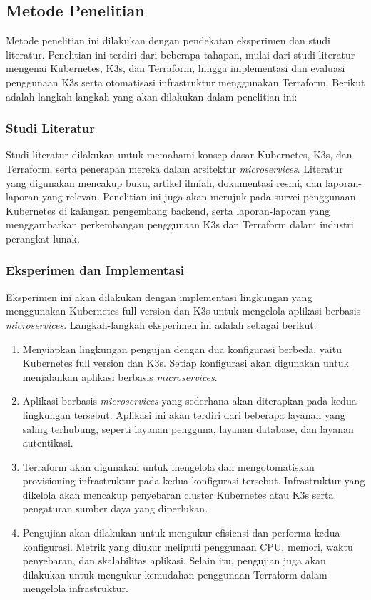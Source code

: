 \subsection{Metode Penelitian}

Metode penelitian ini dilakukan dengan pendekatan eksperimen dan studi literatur. Penelitian ini terdiri dari beberapa tahapan, mulai dari studi literatur mengenai Kubernetes, K3s, dan Terraform, hingga implementasi dan evaluasi penggunaan K3s serta otomatisasi infrastruktur menggunakan Terraform. Berikut adalah langkah-langkah yang akan dilakukan dalam penelitian ini:

\subsubsection{Studi Literatur}
Studi literatur dilakukan untuk memahami konsep dasar Kubernetes, K3s, dan Terraform, serta penerapan mereka dalam arsitektur \textit{microservices}. Literatur yang digunakan mencakup buku, artikel ilmiah, dokumentasi resmi, dan laporan-laporan yang relevan. Penelitian ini juga akan merujuk pada survei penggunaan Kubernetes di kalangan pengembang backend, serta laporan-laporan yang menggambarkan perkembangan penggunaan K3s dan Terraform dalam industri perangkat lunak.

\subsubsection{Eksperimen dan Implementasi}
Eksperimen ini akan dilakukan dengan implementasi lingkungan yang menggunakan Kubernetes full version dan K3s untuk mengelola aplikasi berbasis \textit{microservices}. Langkah-langkah eksperimen ini adalah sebagai berikut:
\begin{enumerate}
    \renewcommand{\labelenumi}{\arabic{enumi})}  
    \item Menyiapkan lingkungan pengujan dengan dua konfigurasi berbeda, yaitu Kubernetes full version dan K3s. Setiap konfigurasi akan digunakan untuk menjalankan aplikasi berbasis \textit{microservices}.
    
    \item Aplikasi berbasis \textit{microservices} yang sederhana akan diterapkan pada kedua lingkungan tersebut. Aplikasi ini akan terdiri dari beberapa layanan yang saling terhubung, seperti layanan pengguna, layanan database, dan layanan autentikasi.
    
    \item Terraform akan digunakan untuk mengelola dan mengotomatiskan provisioning infrastruktur pada kedua konfigurasi tersebut. Infrastruktur yang dikelola akan mencakup penyebaran cluster Kubernetes atau K3s serta pengaturan sumber daya yang diperlukan.
    
    \item Pengujian akan dilakukan untuk mengukur efisiensi dan performa kedua konfigurasi. Metrik yang diukur meliputi penggunaan CPU, memori, waktu penyebaran, dan skalabilitas aplikasi. Selain itu, pengujian juga akan dilakukan untuk mengukur kemudahan penggunaan Terraform dalam mengelola infrastruktur.
\end{enumerate}

